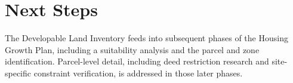 \documentclass[
  letterpaper,
  DIV=11,
  numbers=noendperiod]{scrreprt}
\begin{document}

\chapter{Next Steps}\label{next-steps-1}

The Developable Land Inventory feeds into subsequent phases of the
Housing Growth Plan, including a suitability analysis and the parcel and
zone identification. Parcel-level detail, including deed restriction
research and site-specific constraint verification, is addressed in
those later phases.
\end{document}
